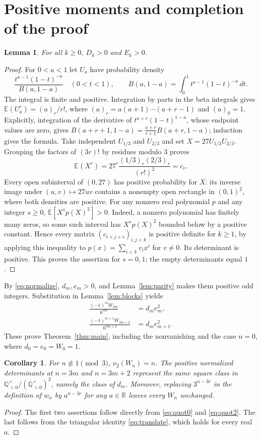 \documentclass[11pt]{article}
\newtheorem{lemma}[theorem]{Lemma}
\newtheorem{corollary}[theorem]{Corollary}
\newcommand{\RR}{\mathbb R}
\begin{document}
\section{Positive moments and completion of the proof}
\begin{lemma}\label{lem:positive}
For all $k\geq0$, $D_k>0$ and $E_k>0$.
\end{lemma}
\begin{proof}
For $0<a<1$ let $U_a$ have probability density
\[
 \frac{t^{a-1}(1-t)^{-a}}{B(a,1-a)}\quad(0<t<1),\qquad
 B(a,1-a)=\int_0^1t^{a-1}(1-t)^{-a}\,dt.
\]
The integral is finite and positive. Integration by parts in the beta
integrals gives
$\mathbb E(U_a^r)=(a)_r/r!$, where
$(a)_r=a(a+1)\cdots(a+r-1)$ and $(a)_0=1$.
Explicitly, integration of the derivative of
$t^{a+r}(1-t)^{1-a}$, whose endpoint values are zero, gives
$B(a+r+1,1-a)=\frac{a+r}{r+1}B(a+r,1-a)$; induction gives the formula.
Take independent $U_{1/3}$ and $U_{2/3}$ and set
$X=27U_{1/3}U_{2/3}$. Grouping the factors of $(3r)!$ by residues modulo
$3$ proves
\[
 \mathbb E(X^r)=27^r\frac{(1/3)_r(2/3)_r}{(r!)^2}=c_r.
\]
Every open subinterval of $(0,27)$ has positive probability for $X$:
its inverse image under $(u,v)\mapsto27uv$ contains a nonempty open
rectangle in $(0,1)^2$, where both densities are positive.
For any nonzero real polynomial $p$ and any integer $s\geq0$,
$\mathbb E[X^s p(X)^2]>0$. Indeed, a nonzero polynomial has finitely
many zeros, so some such interval has $X^s p(X)^2$ bounded below by a
positive constant. Hence every matrix $(c_{i+j+s})_{i,j<k}$ is positive
definite for $k\geq1$, by applying this inequality to
$p(x)=\sum_{i<k}v_i x^i$ for $v\ne0$. Its determinant is positive.
This proves the assertion for $s=0,1$; the empty determinants equal $1$.
\end{proof}
By \eqref{eq:normalize}, $d_m,e_m>0$, and Lemma~\ref{lem:parity} makes
them positive odd integers. Substitution in Lemma~\ref{lem:blocks} yields
\begin{align}
 \frac{(-1)^mW_{3m}}{6^{3m}}&=d_m e_m^2,\label{eq:quot0}\\
 \frac{(-1)^{m+1}W_{3m+2}}{6^{3m+2}}&=d_m e_{m+1}^2.\label{eq:quot2}
\end{align}
These prove Theorem~\ref{thm:main}, including the nonvanishing and the
case $n=0$, where $d_0=e_0=W_0=1$.

\begin{corollary}\label{cor:extra}
For $n\not\equiv1\pmod3$, $\nu_2(W_n)=n$.
The positive normalized determinants at $n=3m$ and $n=3m+2$ represent the
same square class in $\mathbb Q_{>0}^{\times}/(\mathbb Q_{>0}^{\times})^2$,
namely the class of $d_m$.
Moreover, replacing $3^{n-3r}$ in the definition of $w_n$ by
$a^{n-3r}$ for any $a\in\RR$ leaves every $W_n$ unchanged.
\end{corollary}
\begin{proof}
The first two assertions follow directly from \eqref{eq:quot0} and
\eqref{eq:quot2}. The last follows from the triangular identity
\eqref{eq:translate}, which holds for every real $a$.
\end{proof}
\end{document}
